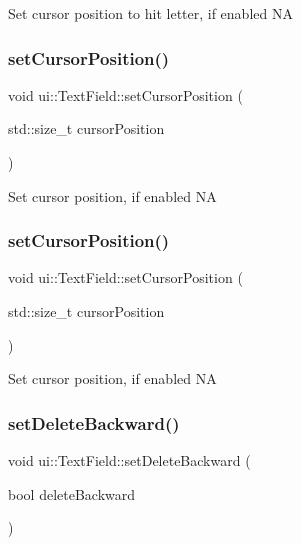 Set cursor position to hit letter, if enabled  NA \mbox{\label{classui_1_1TextField_a04e48a8fd94ac2015cdaafe73ca62c76}} 
\subsubsection{\texorpdfstring{set\+Cursor\+Position()}{setCursorPosition()}\hspace{0.1cm}{\footnotesize\ttfamily [1/2]}}
{\footnotesize\ttfamily void ui\+::\+Text\+Field\+::set\+Cursor\+Position (\begin{DoxyParamCaption}\item[{std\+::size\+\_\+t}]{cursor\+Position }\end{DoxyParamCaption})}

Set cursor position, if enabled  NA \mbox{\label{classui_1_1TextField_a04e48a8fd94ac2015cdaafe73ca62c76}} 
\subsubsection{\texorpdfstring{set\+Cursor\+Position()}{setCursorPosition()}\hspace{0.1cm}{\footnotesize\ttfamily [2/2]}}
{\footnotesize\ttfamily void ui\+::\+Text\+Field\+::set\+Cursor\+Position (\begin{DoxyParamCaption}\item[{std\+::size\+\_\+t}]{cursor\+Position }\end{DoxyParamCaption})}

Set cursor position, if enabled  NA \mbox{\label{classui_1_1TextField_af82f6143c7a6554e654a73527bf7e83e}} 
\subsubsection{\texorpdfstring{set\+Delete\+Backward()}{setDeleteBackward()}\hspace{0.1cm}{\footnotesize\ttfamily [1/2]}}
{\footnotesize\ttfamily void ui\+::\+Text\+Field\+::set\+Delete\+Backward (\begin{DoxyParamCaption}\item[{bool}]{delete\+Backward }\end{DoxyParamCaption})}



